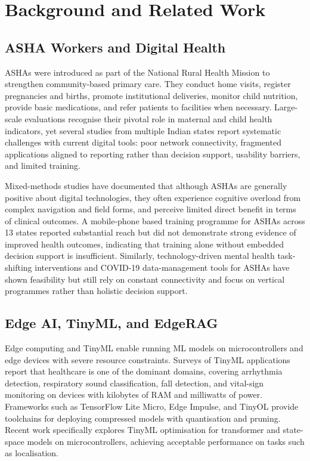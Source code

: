 \documentclass[conference]{IEEEtran}
\begin{document}
\section{Background and Related Work}

\subsection{ASHA Workers and Digital Health}
ASHAs were introduced as part of the National Rural Health Mission to strengthen community-based primary care. They conduct home visits, register pregnancies and births, promote institutional deliveries, monitor child nutrition, provide basic medications, and refer patients to facilities when necessary. Large-scale evaluations recognise their pivotal role in maternal and child health indicators, yet several studies from multiple Indian states report systematic challenges with current digital tools: poor network connectivity, fragmented applications aligned to reporting rather than decision support, usability barriers, and limited training.

Mixed-methods studies have documented that although ASHAs are generally positive about digital technologies, they often experience cognitive overload from complex navigation and field forms, and perceive limited direct benefit in terms of clinical outcomes. A mobile-phone based training programme for ASHAs across 13 states reported substantial reach but did not demonstrate strong evidence of improved health outcomes, indicating that training alone without embedded decision support is insufficient. Similarly, technology-driven mental health task-shifting interventions and COVID-19 data-management tools for ASHAs have shown feasibility but still rely on constant connectivity and focus on vertical programmes rather than holistic decision support.

\subsection{Edge AI, TinyML, and EdgeRAG}
Edge computing and TinyML enable running ML models on microcontrollers and edge devices with severe resource constraints. Surveys of TinyML applications report that healthcare is one of the dominant domains, covering arrhythmia detection, respiratory sound classification, fall detection, and vital-sign monitoring on devices with kilobytes of RAM and milliwatts of power. Frameworks such as TensorFlow Lite Micro, Edge Impulse, and TinyOL provide toolchains for deploying compressed models with quantisation and pruning. Recent work specifically explores TinyML optimisation for transformer and state-space models on microcontrollers, achieving acceptable performance on tasks such as localisation.
\end{document}

